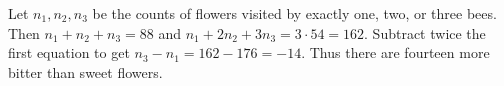 Let $n_1,n_2,n_3$ be the counts of flowers visited by exactly one, two, or three bees. Then $n_1+n_2+n_3=88$ and $n_1+2n_2+3n_3=3\cdot54=162$. Subtract twice the first equation to get $n_3-n_1=162-176=\boxed{-14}$. Thus there are fourteen more bitter than sweet flowers.
